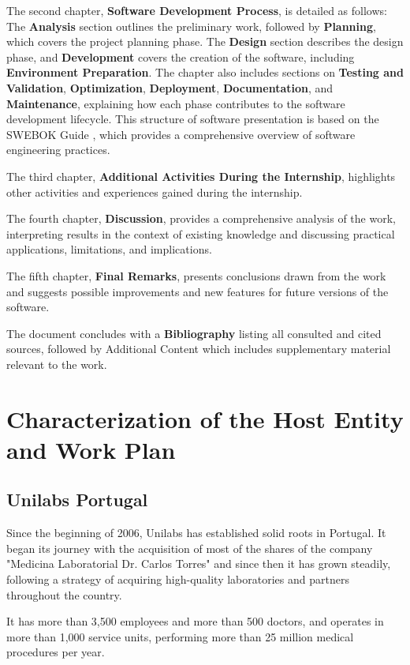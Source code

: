 The second chapter, \textbf{Software Development Process}, is detailed as follows: The \textbf{Analysis} section outlines the preliminary work, followed by \textbf{Planning}, which covers the project planning phase. The \textbf{Design} section describes the design phase, and \textbf{Development} covers the creation of the software, including \textbf{Environment Preparation}. The chapter also includes sections on \textbf{Testing and Validation}, \textbf{Optimization}, \textbf{Deployment}, \textbf{Documentation}, and \textbf{Maintenance}, explaining how each phase contributes to the software development lifecycle. This structure of software presentation is based on the SWEBOK Guide \cite{SWEBOK}, which provides a comprehensive overview of software engineering practices.

The third chapter, \textbf{Additional Activities During the Internship}, highlights other activities and experiences gained during the internship.

The fourth chapter, \textbf{Discussion}, provides a comprehensive analysis of the work, interpreting results in the context of existing knowledge and discussing practical applications, limitations, and implications.

The fifth chapter, \textbf{Final Remarks}, presents conclusions drawn from the work and suggests possible improvements and new features for future versions of the software.

The document concludes with a \textbf{Bibliography} listing all consulted and cited sources, followed by Additional Content which includes supplementary material relevant to the work.

\section{Characterization of the Host Entity and Work Plan} \label{sec:intro_characterization}
\subsection{Unilabs Portugal} \label{subsec:unilabs}

Since the beginning of 2006, Unilabs has established solid roots in Portugal. It began its journey with the acquisition of most of the shares of the company "Medicina Laboratorial Dr. Carlos Torres" and since then it has grown steadily, following a strategy of acquiring high-quality laboratories and partners throughout the country. 

It has more than 3,500 employees and more than 500 doctors, and operates in more than 1,000 service units, performing more than 25 million medical procedures per year. 

